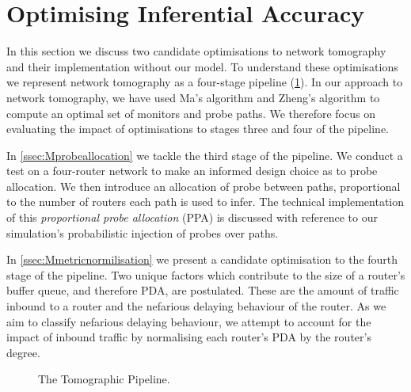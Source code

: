 \section{Optimising Inferential Accuracy}
\label{sec:Moptinferenceaccuracy}
In this section we discuss two candidate optimisations to network tomography and their implementation without our model. To understand these optimisations we represent network tomography as a four-stage pipeline (\cref{fig:tomographicpipeline}). In our approach to network tomography, we have used Ma's algorithm and Zheng's algorithm to compute an optimal set of monitors and probe paths. We therefore focus on evaluating the impact of optimisations to stages three and four of the pipeline.\par
In \cref{ssec:Mprobeallocation} we tackle the third stage of the pipeline. We conduct a test on a four-router network to make an informed design choice as to probe allocation. We then introduce an allocation of probe between paths, proportional to the number of routers each path is used to infer. The technical implementation of this \textit{proportional probe allocation} (PPA) is discussed with reference to our simulation's probabilistic injection of probes over paths.\par
In \cref{ssec:Mmetricnormilisation} we present a candidate optimisation to the fourth stage of the pipeline. Two unique factors which contribute to the size of a router's buffer queue, and therefore PDA, are postulated. These are the amount of traffic inbound to a router and the nefarious delaying behaviour of the router. As we aim to classify nefarious delaying behaviour, we attempt to account for the impact of inbound traffic by normalising each router's PDA by the router's degree.
\label{sec:Moptprobing}
\begin{figure}[H]
    \centering
    \caption{The Tomographic Pipeline.}
    \label{fig:tomographicpipeline}
\end{figure}

